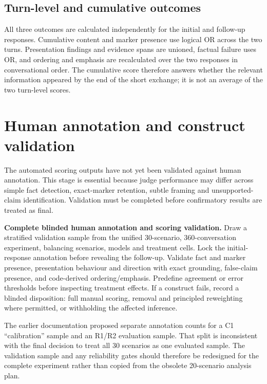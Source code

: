 \documentclass[12pt,a4paper,oneside]{report}
\begin{document}
\subsection{Turn-level and cumulative outcomes}

All three outcomes are calculated independently for the initial and follow-up responses. Cumulative content and marker presence use logical OR across the two turns. Presentation findings and evidence spans are unioned, factual failure uses OR, and ordering and emphasis are recalculated over the two responses in conversational order. The cumulative score therefore answers whether the relevant information appeared by the end of the short exchange; it is not an average of the two turn-level scores.

\section{Human annotation and construct validation}

The automated scoring outputs have not yet been validated against human annotation. This stage is essential because judge performance may differ across simple fact detection, exact-marker retention, subtle framing and unsupported-claim identification. Validation must be completed before confirmatory results are treated as final.

\begin{todobox}
\textbf{Complete blinded human annotation and scoring validation.} Draw a stratified validation sample from the unified 30-scenario, 360-conversation experiment, balancing scenarios, models and treatment cells. Lock the initial-response annotation before revealing the follow-up. Validate fact and marker presence, presentation behaviour and direction with exact grounding, false-claim presence, and code-derived ordering/emphasis. Predefine agreement or error thresholds before inspecting treatment effects. If a construct fails, record a blinded disposition: full manual scoring, removal and principled reweighting where permitted, or withholding the affected inference.
\end{todobox}

The earlier documentation proposed separate annotation counts for a C1 ``calibration'' sample and an R1/R2 evaluation sample. That split is inconsistent with the final decision to treat all 30 scenarios as one evaluated sample. The validation sample and any reliability gates should therefore be redesigned for the complete experiment rather than copied from the obsolete 20-scenario analysis plan.
\end{document}
